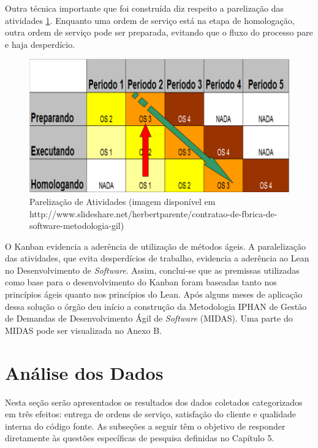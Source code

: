 Outra técnica importante que foi construída diz respeito a parelização das atividades \ref{kanban5}. Enquanto uma ordem de serviço está na etapa de homologação, outra ordem de serviço pode ser preparada, evitando que o fluxo do processo pare e haja desperdício. 

\begin{figure}[H]
		\centering
		
			\includegraphics[scale=0.5]{figuras/kanbanIPHAN5.png}
		\caption{Parelização de Atividades (imagem disponível em http://www.slideshare.net/herbertparente/contratao-de-fbrica-de-software-metodologia-gil)}
		\label{kanban5}
\end{figure}

O Kanban evidencia a aderência de utilização de métodos ágeis. A paralelização das atividades, que evita desperdícios de trabalho, evidencia a aderência ao Lean no Desenvolvimento de \textit{Software}. Assim, conclui-se que as premissas utilizadas como base para o desenvolvimento do Kanban foram baseadas tanto nos princípios ágeis quanto nos princípios do Lean. Após alguns meses de aplicação dessa solução o órgão deu início a construção da Metodologia IPHAN de Gestão de Demandas de Desenvolvimento Ágil de \textit{Software} (MIDAS). Uma parte do MIDAS pode ser visualizada no Anexo B. 


\section[Análise dos Dados]{Análise dos Dados}

Nesta seção serão apresentados os resultados dos dados coletados categorizados em três efeitos: entrega de ordens de serviço, satisfação do cliente e qualidade interna do código fonte. As subseções a seguir têm o objetivo de responder diretamente às questões específicas de pesquisa definidas no Capítulo 5.

